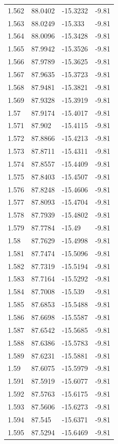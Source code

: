 \begin{tabular}{llll}
1.562 & 88.0402 & -15.3232 & -9.81 \\
1.563 & 88.0249 & -15.333 & -9.81 \\
1.564 & 88.0096 & -15.3428 & -9.81 \\
1.565 & 87.9942 & -15.3526 & -9.81 \\
1.566 & 87.9789 & -15.3625 & -9.81 \\
1.567 & 87.9635 & -15.3723 & -9.81 \\
1.568 & 87.9481 & -15.3821 & -9.81 \\
1.569 & 87.9328 & -15.3919 & -9.81 \\
1.57 & 87.9174 & -15.4017 & -9.81 \\
1.571 & 87.902 & -15.4115 & -9.81 \\
1.572 & 87.8866 & -15.4213 & -9.81 \\
1.573 & 87.8711 & -15.4311 & -9.81 \\
1.574 & 87.8557 & -15.4409 & -9.81 \\
1.575 & 87.8403 & -15.4507 & -9.81 \\
1.576 & 87.8248 & -15.4606 & -9.81 \\
1.577 & 87.8093 & -15.4704 & -9.81 \\
1.578 & 87.7939 & -15.4802 & -9.81 \\
1.579 & 87.7784 & -15.49 & -9.81 \\
1.58 & 87.7629 & -15.4998 & -9.81 \\
1.581 & 87.7474 & -15.5096 & -9.81 \\
1.582 & 87.7319 & -15.5194 & -9.81 \\
1.583 & 87.7164 & -15.5292 & -9.81 \\
1.584 & 87.7008 & -15.539 & -9.81 \\
1.585 & 87.6853 & -15.5488 & -9.81 \\
1.586 & 87.6698 & -15.5587 & -9.81 \\
1.587 & 87.6542 & -15.5685 & -9.81 \\
1.588 & 87.6386 & -15.5783 & -9.81 \\
1.589 & 87.6231 & -15.5881 & -9.81 \\
1.59 & 87.6075 & -15.5979 & -9.81 \\
1.591 & 87.5919 & -15.6077 & -9.81 \\
1.592 & 87.5763 & -15.6175 & -9.81 \\
1.593 & 87.5606 & -15.6273 & -9.81 \\
1.594 & 87.545 & -15.6371 & -9.81 \\
1.595 & 87.5294 & -15.6469 & -9.81 \\

\end{tabular}
